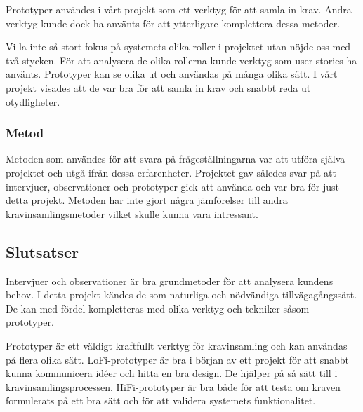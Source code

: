Prototyper användes i vårt projekt som ett verktyg för att samla in krav. Andra verktyg kunde dock ha använts för att ytterligare komplettera dessa metoder. 

Vi la inte så stort fokus på systemets olika roller i projektet utan nöjde oss med två stycken. För att analysera de olika rollerna kunde verktyg som user-stories ha använts.
Prototyper kan se olika ut och användas på många olika sätt. I vårt projekt visades att de var bra för att samla in krav och snabbt reda ut otydligheter. 
\subsubsection{Metod}
Metoden som användes för att svara på frågeställningarna var att utföra själva projektet och utgå ifrån dessa erfarenheter. Projektet gav således svar på att intervjuer, observationer och prototyper gick att använda och var bra för just detta projekt. Metoden har inte gjort några jämförelser till andra kravinsamlingsmetoder vilket skulle kunna vara intressant. 

\subsection{Slutsatser}
Intervjuer och observationer är bra grundmetoder för att analysera kundens behov. I detta projekt kändes de som naturliga och nödvändiga tillvägagångssätt. De kan med fördel kompletteras med olika verktyg och tekniker såsom prototyper. 

Prototyper är ett väldigt kraftfullt verktyg för kravinsamling och kan användas på flera olika sätt. LoFi-prototyper är bra i början av ett projekt för att snabbt kunna kommunicera idéer och hitta en bra design. De hjälper på så sätt till i kravinsamlingsprocessen. HiFi-prototyper är bra både för att testa om kraven formulerats på ett bra sätt och för att validera systemets funktionalitet.


